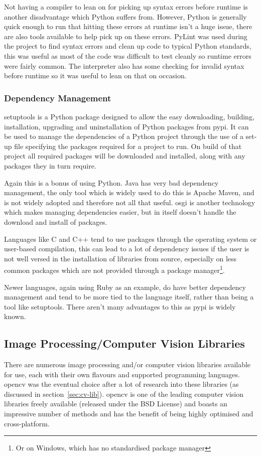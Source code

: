 Not having a compiler to lean on for picking up syntax errors before runtime is another
disadvantage which Python suffers from. However, Python is generally quick enough to run that 
hitting these errors at runtime isn't a huge issue, there are also tools available to help pick up
on these errors. PyLint was used during the project to find syntax errors and clean up code to
typical Python standards, this was useful as most of the code was difficult to test cleanly so
runtime errors were fairly common. The interpreter also has some checking for invalid syntax 
before runtime so it was useful to lean on that on occasion.


\subsubsection{Dependency Management}
setuptools is a Python package designed to allow the easy downloading, building, 
installation, upgrading and uninstallation of Python packages from \gls{pypi}. It can be used to
manage the dependencies of a Python project through the use of a set-up file specifying the 
packages required for a project to run. On build of that project all required packages will be 
downloaded and installed, along with any packages they in turn require.

Again this is a bonus of using Python. Java has very bad dependency management, the only tool
which is widely used to do this is Apache Maven, and is not widely adopted and therefore not all
that useful. \Gls{osgi} is another technology which makes managing dependencies easier, but in 
itself doesn't handle the download and install of packages.

Languages like C and C++ tend to use packages through the operating system or user-based 
compilation, this can lead to a lot of dependency issues if the user is not well versed in the
installation of libraries from source, especially on less common packages which are not provided
through a package manager\footnote{Or on Windows, which has no standardised package manager}.

Newer languages, again using Ruby as an example, do have better dependency management and tend to
be more tied to the language itself, rather than being a tool like setuptools. There aren't
many advantages to this as \gls{pypi} is widely known.


\subsection{Image Processing/Computer Vision Libraries}
There are numerous image processing and/or computer vision libraries available for use, each with
their own flavours and supported programming languages. \gls{opencv} was the eventual choice after a lot
of research into these libraries (as discussed in section~\ref{sec:cv-lib}). \gls{opencv} is one
of the leading computer vision libraries freely available (released under the BSD License) and 
boasts an impressive number of methods and has the benefit of being highly optimised and 
cross-platform.

